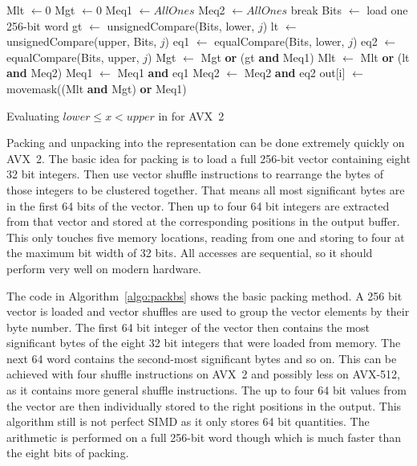 \begin{algorithm}[h]
\begin{algorithmic}[1]
    \State Mlt $\gets 0$
    \State Mgt $\gets 0$
    \State Meq1 $\gets AllOnes$
    \State Meq2 $\gets AllOnes$
        \State break 
      \EndIf
      \State Bits $\gets$ load one 256-bit word
      \State gt $\gets$ unsignedCompare(Bits, lower, $j$)
      \State lt $\gets$ unsignedCompare(upper, Bits, $j$)
      \State eq1 $\gets$ equalCompare(Bits, lower, $j$)
      \State eq2 $\gets$ equalCompare(Bits, upper, $j$)
      \State Mgt $\gets$ Mgt \textbf{or} (gt \textbf{and} Meq1)
      \State Mlt $\gets$ Mlt \textbf{or} (lt \textbf{and} Meq2)
      \State Meq1 $\gets$ Meq1 \textbf{and} eq1
      \State Meq2 $\gets$ Meq2 \textbf{and} eq2
    \EndFor
    \State out[i] $\gets$ movemask((Mlt \textbf{and} Mgt) \textbf{or} Meq1)
  \EndFor
  \EndProcedure
\end{algorithmic}
\caption{Evaluating $lower \le x < upper$ in \bs{} for AVX~2}
\label{algo:byteslicescan}
\end{algorithm}

Packing and unpacking into the \bs{} representation can be done extremely
quickly on AVX~2. The basic idea for packing is to load a full 256-bit vector
containing eight 32 bit integers. Then use vector shuffle instructions to
rearrange the bytes of those integers to be clustered together. That means all
most significant bytes are in the first 64 bits of the vector. Then up to four
64 bit integers are extracted from that vector and stored at the corresponding
positions in the output buffer. This only touches five memory locations, reading
from one and storing to four at the maximum bit width of 32 bits. All accesses
are sequential, so it should perform very well on modern hardware.

The code in Algorithm~\ref{algo:packbs} shows the basic packing method. A 256
bit vector is loaded and vector shuffles are used to group the vector elements
by their byte number. The first 64 bit integer of the vector then contains the
most significant bytes of the eight 32 bit integers that were loaded from
memory. The next 64 word contains the second-most significant bytes and so on.
This can be achieved with four shuffle instructions on AVX~2 and possibly less
on AVX-512, as it contains more general shuffle instructions. The up to four 64
bit values from the vector are then individually stored to the right positions
in the output. This algorithm still is not perfect SIMD as it only stores 64 bit
quantities. The arithmetic is performed on a full 256-bit word though which is
much faster than the eight bits of \bwv{} packing.

